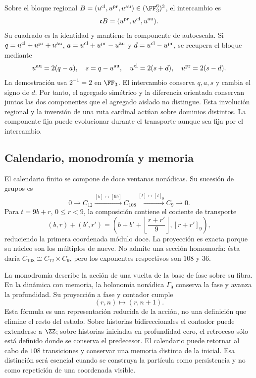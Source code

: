 Sobre el bloque regional
\(B=(u^{\rm cl},u^{\rm pr},u^{\rm au})\in(\FF_3^6)^3\),
el intercambio es
\[
 \mathfrak cB=(u^{\rm pr},u^{\rm cl},u^{\rm au}).
\]
Su cuadrado es la identidad y mantiene la componente de autoescala.
Si \(q=u^{\rm cl}+u^{\rm pr}+u^{\rm au}\),
\(a=u^{\rm cl}+u^{\rm pr}-u^{\rm au}\) y
\(d=u^{\rm cl}-u^{\rm pr}\), se recupera el bloque mediante
\[
 u^{\rm au}=2(q-a),\quad s=q-u^{\rm au},\quad
 u^{\rm cl}=2(s+d),\quad u^{\rm pr}=2(s-d).
\]
La demostración usa \(2^{-1}=2\) en \(\FF_3\). El intercambio
conserva \(q,a,s\) y cambia el signo de \(d\). Por tanto,
el agregado simétrico y la diferencia orientada conservan juntos
las dos componentes que el agregado aislado no distingue.
Esta involución regional y la inversión de una ruta cardinal
actúan sobre dominios distintos. La componente fija puede
evolucionar durante el transporte aunque sea fija por el intercambio.

\subsection{Calendario, monodromía y memoria}

El calendario finito se compone de doce ventanas nonádicas. Su
sucesión de grupos es
\begin{equation}
 0\longrightarrow C_{12}\xrightarrow{[b]\mapsto[9b]}C_{108}
 \xrightarrow{[t]\mapsto[t]_9}C_9\longrightarrow0.
 \label{vi:eq:extension108}
\end{equation}
Para \(t=9b+r\), \(0\le r<9\), la composición contiene
el cociente de transporte
\[
 (b,r)+(b',r')=
 \left(b+b'+\left\lfloor\frac{r+r'}9\right\rfloor,
       [r+r']_9\right),
\]
reduciendo la primera coordenada módulo doce. La proyección es
exacta porque su núcleo son los múltiplos de nueve. No admite una
sección homomorfa: ésta daría \(C_{108}\cong C_{12}\times C_9\),
pero los exponentes respectivos son \(108\) y \(36\).

La monodromía describe la acción de una vuelta de la base de fase
sobre su fibra. En la dinámica con memoria, la holonomía nonádica
\(\Gamma_9\) conserva la fase y avanza la profundidad. Su
proyección a fase y contador cumple
\[
 (r,n)\longmapsto(r,n+1).
\]
Esta fórmula es una representación reducida de la acción, no una
definición que elimine el resto del estado. Sobre historias
bidireccionales el contador puede extenderse a \(\ZZ\); sobre
historias iniciadas en profundidad cero, el retroceso sólo está
definido donde se conserva el predecesor. El calendario puede
retornar al cabo de \(108\) transiciones y conservar una memoria
distinta de la inicial. Esa distinción será esencial cuando se
construya la partícula como persistencia y no como repetición de
una coordenada visible.

